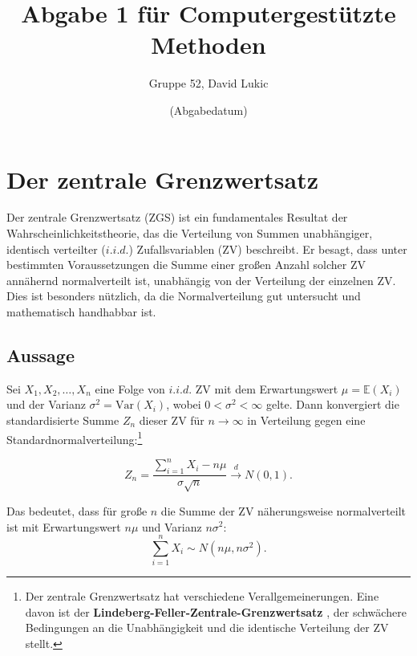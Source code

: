 \documentclass{article}
\title{Abgabe 1 für Computergestützte Methoden}
\author{Gruppe 52, David Lukic}
\date{(Abgabedatum)}
\begin{document}
\maketitle

\tableofcontents

\newpage

\section{Der zentrale Grenzwertsatz}

Der zentrale Grenzwertsatz (ZGS) ist ein fundamentales Resultat der Wahrscheinlichkeitstheorie, das die Verteilung von Summen unabhängiger, identisch verteilter ($i.i.d.$) Zufallsvariablen (ZV) beschreibt. Er besagt, dass unter bestimmten Voraussetzungen die Summe einer großen Anzahl solcher ZV annähernd normalverteilt ist, unabhängig von der Verteilung der einzelnen ZV.  Dies ist besonders nützlich, da die Normalverteilung gut untersucht und mathematisch handhabbar ist.


\subsection{Aussage}

Sei $X_1, X_2, \ldots, X_n$ eine Folge von $i.i.d.$ ZV mit dem Erwartungswert $\mu = \mathbb{E}(X_i)$ und der Varianz $\sigma^2 = \mathrm{Var}(X_i)$, wobei $0 < \sigma^2 < \infty$ gelte. Dann konvergiert die standardisierte Summe $Z_n$ dieser ZV für $n \to \infty$ in Verteilung gegen eine Standardnormalverteilung:\footnote{Der zentrale Grenzwertsatz hat verschiedene Verallgemeinerungen. Eine davon ist der \textbf{Lindeberg-Feller-Zentrale-Grenzwertsatz} \cite[Seite 328]{klenke2013}, der schwächere Bedingungen an die Unabhängigkeit und die identische Verteilung der ZV stellt.}

\begin{equation}
Z_n = \frac{\sum_{i=1}^n X_i - n\mu}{\sigma \sqrt{n}} \xrightarrow{d} N(0,1). \label{Konvergenz}
\end{equation}

Das bedeutet, dass für große $n$ die Summe der ZV näherungsweise normalverteilt ist mit Erwartungswert $n\mu$ und Varianz $n\sigma^2$:
\begin{equation}
\sum_{i=1}^n X_i \sim N(n\mu, n\sigma^2). \label{Näherung}
\end{equation}
\end{document}
